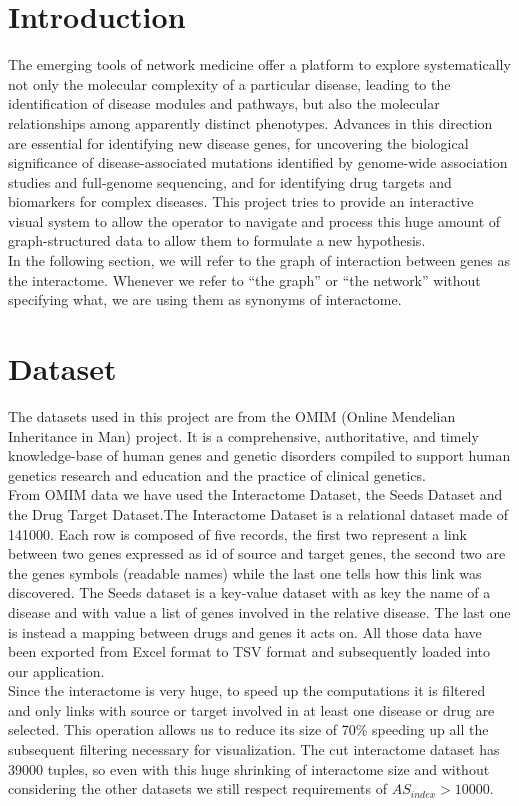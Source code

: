 \documentclass[12pt,twocolumn,twoside]{article}
\begin{document}
	\section*{Introduction}
	The emerging tools of network medicine offer a platform to explore systematically not only the molecular complexity of a particular disease, leading to the identification of disease modules and pathways, but also the molecular relationships among apparently distinct phenotypes. Advances in this direction are essential for identifying new disease genes, for uncovering the biological significance of disease-associated mutations identified by genome-wide association studies and full-genome sequencing, and for identifying drug targets and biomarkers for complex diseases. This project tries to provide an interactive visual system to allow the operator to navigate and process this huge amount of graph-structured data to allow them to formulate a new hypothesis.\\ %
	In the following section, we will refer to the graph of interaction between genes as the interactome. Whenever we refer to ``the graph'' or ``the network'' without specifying what, we are using them as synonyms of interactome. 
	
	\section*{Dataset} %
	The datasets used in this project are from the OMIM (Online Mendelian Inheritance in Man) \cite{OMIM} project. It is a comprehensive, authoritative, and timely knowledge-base of human genes and genetic disorders compiled to support human genetics research and education and the practice of clinical genetics. \\
	From OMIM data we have used the Interactome Dataset, the Seeds Dataset and the Drug Target Dataset.\newline The Interactome Dataset is a relational dataset made of 141000. Each row is composed of five records, the first two represent a link between two genes expressed as id of source and target genes, the second two are the genes symbols (readable names) while the last one tells how this link was discovered. The Seeds dataset is a key-value dataset with as key the name of a disease and with value a list of genes involved in the relative disease. The last one is instead a mapping between drugs and genes it acts on. All those data have been exported from Excel format to TSV format and subsequently loaded into our application.\\ Since the interactome is very huge, to speed up the computations it is filtered and only links with source or target involved in at least one disease or drug are selected. This operation allows us to reduce its size of 70\% speeding up all the subsequent filtering necessary for visualization. The cut interactome dataset has $39000$ tuples, so even with this huge shrinking of interactome size and without considering the other datasets we still respect requirements of $AS_{index} > 10000$.
	
\end{document}
